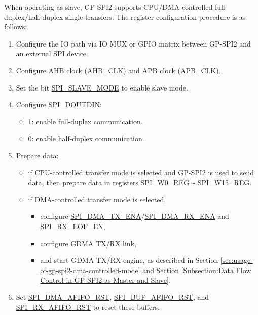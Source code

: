 \documentclass[main\_\_EN.tex]{subfiles}
\begin{document}
When operating as slave, GP-SPI2 supports CPU/DMA-controlled full-duplex/half-duplex single transfers. The register configuration procedure is as follows:
\begin{enumerate}
    \item Configure the IO path via IO MUX or GPIO matrix between GP-SPI2 and an external SPI device. 
    
    \item Configure AHB clock (AHB\_CLK) and APB clock (APB\_CLK).

    \item Set the bit \hyperref[fielddesc:SPISLAVEMODE]{SPI\_SLAVE\_MODE} to enable slave mode. 
    
    \item Configure \hyperref[fielddesc:SPIDOUTDIN]{SPI\_DOUTDIN}:
    \begin{itemize}
        \item 1: enable full-duplex communication.
        \item 0: enable half-duplex communication.
    \end{itemize}
    
    \item Prepare data:
    \begin{itemize}
        \item if CPU-controlled transfer mode is selected and GP-SPI2 is used to send data, then prepare data in registers \hyperref[regdesc:SPIW0REG]{SPI\_W0\_REG} \verb+~+ \hyperref[regdesc:SPIW0REG]{SPI\_W15\_REG}.
        \item if DMA-controlled transfer mode is selected,
        \begin{itemize}
            \item configure \hyperref[fielddesc:SPIDMATXENA]{SPI\_DMA\_TX\_ENA}/\hyperref[fielddesc:SPIDMARXENA]{SPI\_DMA\_RX\_ENA} and \hyperref[fielddesc:SPIRXEOFEN]{SPI\_RX\_EOF\_EN},
            \item configure GDMA TX/RX link,
            \item and start GDMA TX/RX engine, as described in Section \ref{sec:usage-of-gp-spi2-dma-controlled-mode} and Section \ref{Subsection:Data Flow Control in GP-SPI2 as Master and Slave}.
        \end{itemize}
    \end{itemize}
    
    \item Set \hyperref[fielddesc:SPIDMAAFIFORST]{SPI\_DMA\_AFIFO\_RST}, \hyperref[fielddesc:SPIBUFAFIFORST]{SPI\_BUF\_AFIFO\_RST}, and \hyperref[fielddesc:SPIRXAFIFORST]{SPI\_RX\_AFIFO\_RST} to reset these buffers.
    

\end{enumerate}
\end{document}
